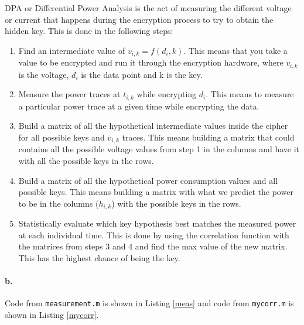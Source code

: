 \documentclass[letterpaper]{article}
\begin{document}
DPA or Differential Power Analysis is the act of measuring the different voltage or current that happens during the encryption process to try to obtain the hidden key. This is done in the following steps:
\begin{enumerate}
    \item Find an intermediate value of $v_{i,k}=f(d_{i},k)$. This means that you take a value to be encrypted and run it through the encryption hardware, where $v_{i,k}$ is the voltage, $d_{i}$ is the data point and k is the key.
    
    \item  Measure the power traces at $t_{i,k}$ while encrypting $d_{i}$. This means to measure a particular power trace at a given time while encrypting the data.
    
    \item  Build a matrix of all the hypothetical intermediate values inside the cipher for all possible keys and $v_{i,k}$ traces. This means building a matrix that could contains all the possible voltage values from step 1 in the columns and have it with all the possible keys in the rows.
    
    \item Build a matrix of all the hypothetical power consumption values and all possible keys. This means building a matrix with what we predict the power to be in the columns ($h_{i,k}$) with the possible keys in the rows.
    
    \item Statistically evaluate which key hypothesis best matches the measured power at each individual time. This is done by using the correlation function with the matrices from steps 3 and 4 and find the max value of the new matrix. This has the highest chance of being the key.
\end{enumerate}


\paragraph{b.}
Code from \texttt{measurement.m} is shown in Listing \ref{meas} and code from \texttt{mycorr.m} is shown in Listing \ref{mycorr}.




\end{document}
